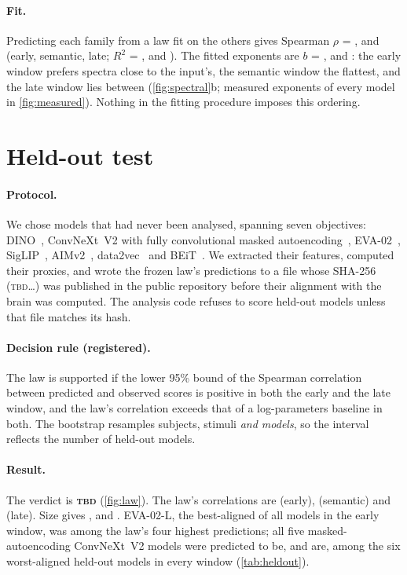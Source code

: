 \documentclass[10pt]{article}
\theoremstyle{plain}
\theoremstyle{definition}
\theoremstyle{remark}
\newcommand{\tbd}{\textcolor{hrhmuted}{\textsc{tbd}}}
\newcommand{\vLawVerdict}{\tbd}\newcommand{\vHash}{\tbd}\newcommand{\vSlopeBound}{\tbd}
\begin{document}
\paragraph{Fit.} Predicting each family from a law fit on the others gives Spearman
$\rho$ = \vCvEarly, \vCvMid{} and \vCvLate{} (early, semantic, late; $R^2$ = \vCvREarly,
\vCvRMid{} and \vCvRLate). The fitted exponents are $b$ = \vBEarly, \vBMid{} and \vBLate: the
early window prefers spectra close to the input's, the semantic window the flattest, and the
late window lies between (\cref{fig:spectral}b; measured exponents of every model in
\cref{fig:measured}). Nothing in the fitting procedure imposes
this ordering.

\section{Held-out test}
\label{sec:heldout}

\paragraph{Protocol.} We chose \vNheld{} models that had never been analysed, spanning seven
objectives: DINO~\citep{caron2021dino}, ConvNeXt~V2 with fully convolutional masked
autoencoding~\citep{woo2023convnextv2}, EVA-02~\citep{fang2024eva02}, SigLIP~\citep{zhai2023siglip},
AIMv2~\citep{fini2025aimv2}, data2vec~\citep{baevski2022data2vec} and
BEiT~\citep{bao2022beit}. We extracted their features, computed their proxies, and wrote the
frozen law's predictions to a file whose SHA-256 (\vHash\ldots) was published in the public
repository before their alignment with the brain was computed. The analysis code refuses to
score held-out models unless that file matches its hash.

\paragraph{Decision rule (registered).} The law is supported if the lower 95\% bound of the
Spearman correlation between predicted and observed scores is positive in both the early and
the late window, and the law's correlation exceeds that of a log-parameters baseline in both. The
bootstrap resamples subjects, stimuli \emph{and models}, so the interval reflects the number of
held-out models.

\paragraph{Result.} The verdict is \textbf{\vLawVerdict} (\cref{fig:law}). The law's correlations
are \vRhoEarly{} (early), \vRhoMid{} (semantic) and \vRhoLate{} (late). Size gives \vParEarly,
\vParMid{} and \vParLate. EVA-02-L, the best-aligned of all \vNall{} models in the early window,
was among the law's four highest predictions; all five masked-autoencoding ConvNeXt~V2 models were
predicted to be, and are, among the six worst-aligned held-out models in every window
(\cref{tab:heldout}).
\end{document}
